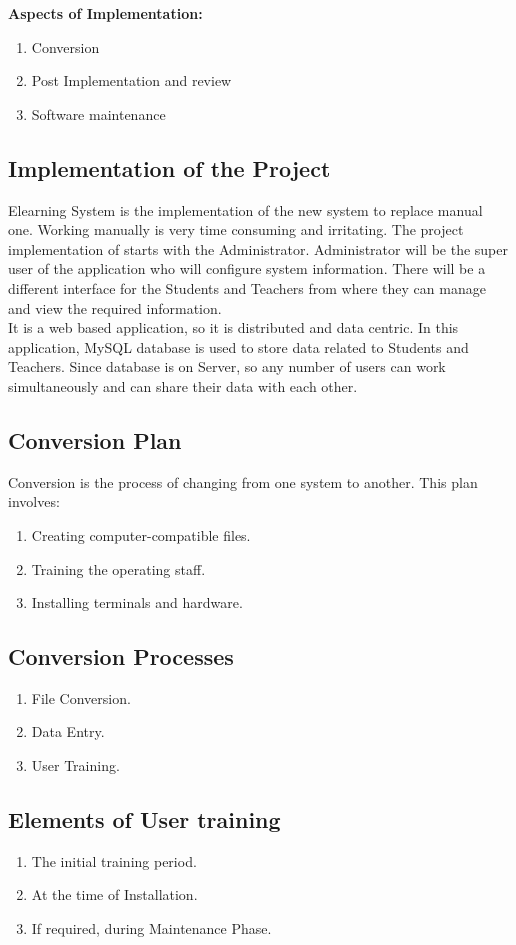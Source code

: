 \hspace{0.0cm} {\bf Aspects of Implementation:}
\begin{enumerate}
\item Conversion
\item Post Implementation and review
\item Software maintenance
\end{enumerate}
\vskip 0.5cm
\subsection{Implementation of the Project }
Elearning System is the implementation of the new system to replace manual one. Working manually is very time consuming and irritating. The project 
implementation of starts with the Administrator. Administrator will be the super user of the application who will configure system information. There will be a different interface for the Students and Teachers from where they can manage and view the required information.\\

\noindent It is a web based application, so it is distributed and data centric. 
In this application, MySQL database is used to store data related to 
Students and Teachers. Since database is on 
Server, so any number of users can work simultaneously and can share 
their data with each other.
\subsection{Conversion Plan}
Conversion is the process of changing from one system to another. This 
plan involves:
\begin{enumerate}
\item Creating computer-compatible files.
\item Training the operating staff.
\item Installing terminals and hardware.
\end{enumerate}

\subsection{Conversion Processes}
\begin{enumerate}
\item File Conversion.
\item  Data Entry.
\item User Training.
\end{enumerate}
\vskip 0.5cm
\subsection{Elements of User training}
\begin{enumerate}
\item The initial training period.
\item At the time of Installation.
\item If required, during Maintenance Phase.
\end{enumerate}

